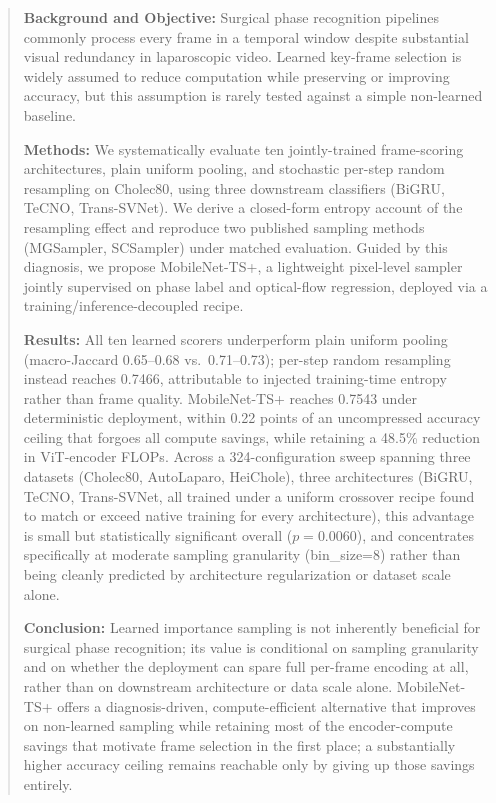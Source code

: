 \documentclass[preprint,12pt]{elsarticle}
\begin{document}
\begin{frontmatter}
\begin{abstract}
\textbf{Background and Objective:} Surgical phase recognition pipelines commonly process every frame in a temporal window despite substantial visual redundancy in laparoscopic video. Learned key-frame selection is widely assumed to reduce computation while preserving or improving accuracy, but this assumption is rarely tested against a simple non-learned baseline.

\textbf{Methods:} We systematically evaluate ten jointly-trained frame-scoring architectures, plain uniform pooling, and stochastic per-step random resampling on Cholec80, using three downstream classifiers (BiGRU, TeCNO, Trans-SVNet). We derive a closed-form entropy account of the resampling effect and reproduce two published sampling methods (MGSampler, SCSampler) under matched evaluation. Guided by this diagnosis, we propose MobileNet-TS+, a lightweight pixel-level sampler jointly supervised on phase label and optical-flow regression, deployed via a training/inference-decoupled recipe.

\textbf{Results:} All ten learned scorers underperform plain uniform pooling (macro-Jaccard 0.65--0.68 vs.\ 0.71--0.73); per-step random resampling instead reaches 0.7466, attributable to injected training-time entropy rather than frame quality. MobileNet-TS+ reaches 0.7543 under deterministic deployment, within 0.22 points of an uncompressed accuracy ceiling that forgoes all compute savings, while retaining a 48.5\% reduction in ViT-encoder FLOPs. Across a 324-configuration sweep spanning three datasets (Cholec80, AutoLaparo, HeiChole), three architectures (BiGRU, TeCNO, Trans-SVNet, all trained under a uniform crossover recipe found to match or exceed native training for every architecture), this advantage is small but statistically significant overall ($p=0.0060$), and concentrates specifically at moderate sampling granularity (bin\_size=8) rather than being cleanly predicted by architecture regularization or dataset scale alone.

\textbf{Conclusion:} Learned importance sampling is not inherently beneficial for surgical phase recognition; its value is conditional on sampling granularity and on whether the deployment can spare full per-frame encoding at all, rather than on downstream architecture or data scale alone. MobileNet-TS+ offers a diagnosis-driven, compute-efficient alternative that improves on non-learned sampling while retaining most of the encoder-compute savings that motivate frame selection in the first place; a substantially higher accuracy ceiling remains reachable only by giving up those savings entirely.
\end{abstract}


\end{frontmatter}
\end{document}
